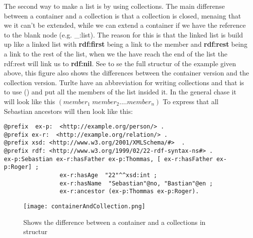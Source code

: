 The second way to make a list is by using collections. The main differense between a container 
and a collection is that a collection is closed, menaing that we it can't be extended, 
while we can extend a container if we have the reference to the blank node (e.g. \_:list). The reason 
for this is that the linked list is build up like a linked list with \textbf{rdf:first} being a link to the member
and \textbf{rdf:rest} being a link to the rest of the list, when we the have reach the end of the 
list the rdf:rest will link us to \textbf{rdf:nil}. See  to se the 
full structur of the example given above, this figure also shows the differences between the container version
and the collection version. Turlte have an abbreviation for writing collections and that is 
to use () and put all the members of the list insided it. In the general chase it will look like this 
$(member_1 \;member_2 .... member_n)$
To express that all Sebastian ancestors will then look like this:
\begin{lstlisting}[frame=single, language=turtle]
@prefix  ex-p:  <http://example.org/person/> . 
@prefix ex-r:  <http://example.org/relation/> . 
@prefix xsd: <http://www.w3.org/2001/XMLSchema/#>  . 
@prefix rdf: <http://www.w3.org/1999/02/22-rdf-syntax-ns#> .
ex-p:Sebastian ex-r:hasFather ex-p:Thommas, [ ex-r:hasFather ex-p:Roger] ; 
                ex-r:hasAge  "22"^^xsd:int ; 
                ex-r:hasName  "Sebastian"@no, "Bastian"@en ;
                ex-r:ancestor (ex-p:Thommas ex-p:Roger).
\end{lstlisting}

\begin{figure}
    \centering
    \texttt{[image: containerAndCollection.png]}
    \caption{Shows the difference between a container and a collections in structur}
    \label{fig:containerAndCollection}
\end{figure}

